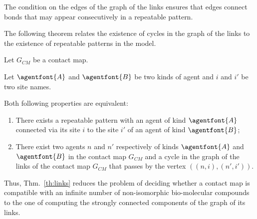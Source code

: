 \documentclass{entcs}
\newcommand{\graphsymb}{G}
\begin{document}
The condition on the edges of the graph of the links  ensures that
edges connect bonds that may appear consecutively in a repeatable pattern.

The following theorem relates the existence of cycles in the graph of the links  to the existence of repeatable patterns in the model.

\begin{theorem}
  \label{th:links}
  Let $\graphsymb_{\textit{CM}}$ be a contact map.

Let $\agentfont{A}$ and $\agentfont{B}$ be two kinds of agent and
$i$ and $i'$ be two site names.

  Both following properties are equivalent:
  \begin{enumerate}
    \item There exists a repeatable pattern
    with an agent of kind $\agentfont{A}$ connected via its site $i$
    to the site $i'$ of an agent of kind $\agentfont{B}$;
\item There exist two agents $n$ and $n'$ respectively of kinds $\agentfont{A}$
and  $\agentfont{B}$ in the contact map $\graphsymb_{\textit{CM}}$ and a  cycle in the graph of the links  of the contact map    $\graphsymb_{\textit{CM}}$  that passes by the vertex $((n,i),(n',i'))$.
  \end{enumerate}
\end{theorem}

Thus, Thm.~\ref{th:links} reduces the problem of deciding whether
a contact map is compatible with an infinite number of non-isomorphic bio-molecular compounds to the one of computing the strongly connected components of the graph of its links.
\end{document}
